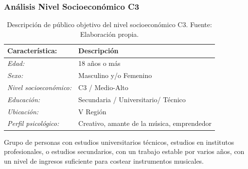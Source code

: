 %

\subsubsection{Análisis Nivel Socioeconómico C3}

\begin{table}[h!]
\centering
	\begin{tabular}{|l|p{5cm}|}
	\hline
	\textbf{Característica:} & \textbf{Descripción}\\\hline
	\emph{Edad:} &	18 años o más\\\hline
	\emph{Sexo:} & 	Masculino y/o Femenino\\\hline
	\emph{Nivel socioeconómico: } & C3 / Medio-Alto \\\hline
	\emph{Educación:} & Secundaria / Universitario/ Técnico\\\hline
	\emph{Ubicación:} & V Región\\\hline
	\emph{Perfil psicológico:} & Creativo, amante de la música, emprendedor\\\hline
	\end{tabular}
\caption[Descripción del público objetivo del nivel socioeconómico
C3]{Descripción de público objetivo del nivel socioeconómico C3. Fuente:
Elaboración propia.}
\end{table}

Grupo de personas con estudios universitarios técnicos, estudios en institutos profesionales,
o estudios secundarios, con un trabajo estable por varios años,
con un nivel de ingresos suficiente para costear instrumentos musicales.



